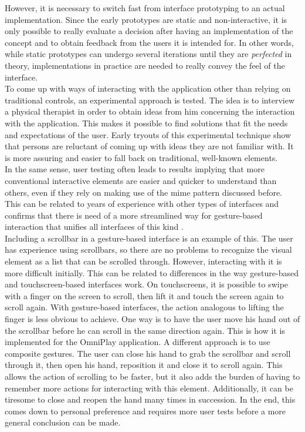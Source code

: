 However, it is necessary to switch fast from interface prototyping to an actual implementation. Since the early prototypes are static and non-interactive, it is only possible to really evaluate a decision after having an implementation of the concept and to obtain feedback from the users it is intended for. In other words, while static prototypes can undergo several iterations until they are \emph{perfected} in theory, implementations in practice are needed to really convey the feel of the interface.\\

To come up with ways of interacting with the application other than relying on traditional controls, an experimental approach is tested. The idea is to interview a physical therapist in order to obtain ideas from him concerning the interaction with the application. This makes it possible to find solutions that fit the needs and expectations of the user. Early tryouts of this experimental technique show that persons are reluctant of coming up with ideas they are not familiar with. It is more assuring and easier to fall back on traditional, well-known elements.\\

In the same sense, user testing often leads to results implying that more conventional interactive elements are easier and quicker to understand than others, even if they rely on making use of the mime pattern discussed before. This can be related to years of experience with other types of interfaces and confirms that there is need of a more streamlined way for gesture-based interaction that unifies all interfaces of this kind \cite{Norman2010}.\\

Including a scrollbar in a gesture-based interface is an example of this. The user has experience using scrollbars, so there are no problems to recognize the visual element as a list that can be scrolled through. However, interacting with it is more difficult initially. This can be related to differences in the way gesture-based and touchscreen-based interfaces work. On touchscreens, it is possible to swipe with a finger on the screen to scroll, then lift it and touch the screen again to scroll again. With gesture-based interfaces, the action analogous to lifting the finger is less obvious to achieve. One way is to have the user move his hand out of the scrollbar before he can scroll in the same direction again. This is how it is implemented for the OmniPlay application. A different approach is to use composite gestures. The user can close his hand to grab the scrollbar and scroll through it, then open his hand, reposition it and close it to scroll again. This allows the action of scrolling to be faster, but it also adds the burden of having to remember more actions for interacting with this element. Additionally, it can be tiresome to close and reopen the hand many times in succession. In the end, this comes down to personal preference and requires more user tests before a more general conclusion can be made.\\



